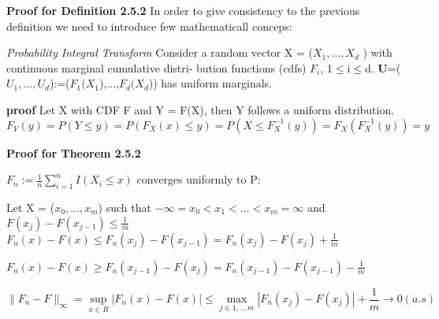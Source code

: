 \textbf{Proof for Definition 2.5.2}
In order to give consistency to the previous definition we need to introduce few mathematicall conceps:
\begin{thm}
\textit{Probability Integral Transform}
Consider a random vector X = ($X_{1} , . . . , X_{d}$ ) with continuous marginal cumulative distri-
bution functions (cdfs) $F_{i}$, 1$\leq$i$\leq$d. 
\textbf{U}=($U_{1},...,U_{d}$):=($F_{1}(X_{1}$),...,$F_{d}(X_{d}$)) has uniform marginals.
\end{thm}
\textbf{proof}
Let X with CDF F and Y = F(X), then Y follows a uniform distribution.
$F_{Y}(y)=P(Y\leq y)=P(F_{X}(x)\leq y) = P(X\leq F^{-1}_{X}(y)) = F_{X}(F^{-1}_{X}(y)) = y$

\textbf{Proof for Theorem 2.5.2}

$F_{n} := \frac{1}{n} \sum_{i=1}^{n} \textit{I}(X_{i} \leq x)$ converges uniformly to P:

Let X = ($x_{0},...,x_{m}$) such that $-\infty = x_{0}<x_{1}< ... <x_{m}=\infty$ and $ F(x_{j}) - F(x_{j-1}) \leq \frac{1}{m}$
$F_{n}(x)-F(x)\leq F_{n}(x_{j})-F(x_{j-1}) = F_{n}(x_{j})-F(x_{j}) + \frac{1}{m}$

$F_{n}(x) - F(x) \geq F_{n}(x_{j-1}) -F(x_{j}) = F_{n}(x_{j-1}) -F(x_{j-1}) - \frac{1}{m}$

$$\|F_{n} - F\|_{\infty}= \sup_{x \in R}|F_{n}(x) - F(x)| \leq \max_{j \in {1,..,m}}|F_{n}(x_{j})-F(x_{j})| + \frac{1}{m} \rightarrow 0 (a.s)$$

